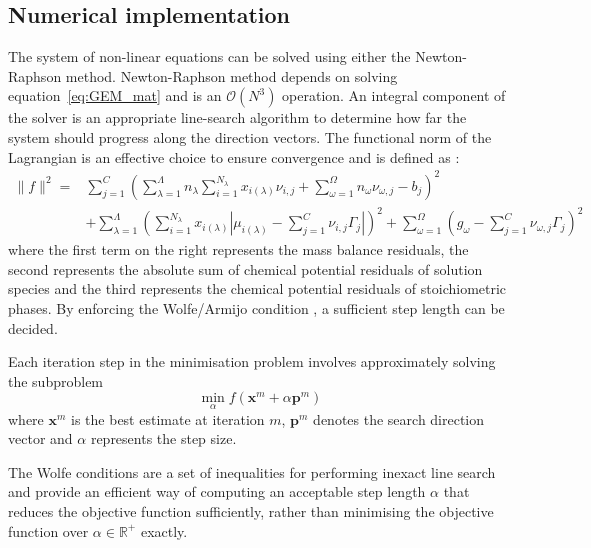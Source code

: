 	\subsection{Numerical implementation}
	The system of non-linear equations can be solved using either the Newton-Raphson method. Newton-Raphson method depends on solving  equation~\eqref{eq:GEM_mat} and is an $\mathcal{O}(N^3)$ operation.
	An integral component of the solver is an appropriate line-search algorithm to determine how far the system should progress along the direction vectors. The functional norm of the Lagrangian is an effective choice to ensure convergence and is defined as \cite{Piro17}:
	\begin{equation}
	\begin{aligned}
		\|f\|^2 = &\sum_{j=1}^{C}\left(\sum_{\lambda=1}^{\Lambda} n_\lambda \sum_{i=1}^{N_\lambda} x_{i(\lambda)}\nu_{i,j} + \sum_{\omega=1}^{\Omega}n_{\omega}\nu_{\omega,j} - b_j\right)^2 \\
		&+ \sum_{\lambda=1}^{\Lambda} \left(\sum_{i=1}^{N_\lambda} x_{i(\lambda)}\left\vert\mu_{i(\lambda)} - \sum_{j=1}^{C}\nu_{i,j} \Gamma_j \right\vert \right)^2 + \sum_{\omega=1}^{\Omega}\left(g_\omega - \sum_{j=1}^{C}\nu_{\omega,j} \Gamma_j \right)^2
		\end{aligned}
	\end{equation}
	where the first term on the right represents the mass balance residuals, the second represents the absolute sum of chemical potential residuals of solution species and the third represents the chemical potential residuals of stoichiometric phases. By enforcing the Wolfe/Armijo condition \cite{Nocedal06}, a sufficient step length can be decided.

	Each iteration step in the minimisation problem involves approximately solving the subproblem
	\begin{equation}
		\min_\alpha f\left(\mathbf{x}^m + \alpha \mathbf{p}^m\right)
	\end{equation}
	where $\mathbf{x}^m$ is the best estimate at iteration $m$, $\mathbf{p}^m$ denotes the search direction vector and $\alpha$ represents the step size.

	The Wolfe conditions are a set of inequalities for performing inexact line search and provide an efficient way of computing an acceptable step length $\alpha$  that reduces the objective function sufficiently, rather than minimising the objective function over $\alpha \in \mathbb {R}^{+}$ exactly.

